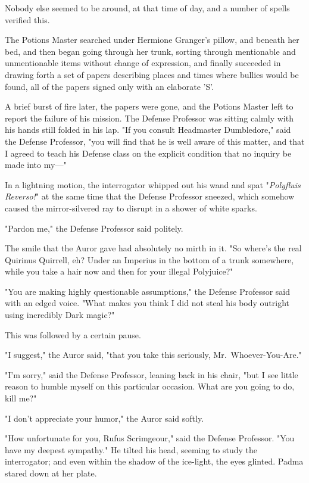 Nobody else seemed to be around, at that time of day, and a number of spells 
verified this.

The Potions Master searched under Hermione Granger's pillow, and beneath her 
bed, and then began going through her trunk, sorting through mentionable and 
unmentionable items without change of expression, and finally succeeded in 
drawing forth a set of papers describing places and times where bullies would 
be found, all of the papers signed only with an elaborate 'S'.

A brief burst of fire later, the papers were gone, and the Potions Master left 
to report the failure of his mission.
\sbreak
The Defense Professor was sitting calmly with his hands still folded in his 
lap. "If you consult Headmaster Dumbledore," said the Defense Professor, "you 
will find that he is well aware of this matter, and that I agreed to teach his 
Defense class on the explicit condition that no inquiry be made into my---"

In a lightning motion, the interrogator whipped out his wand and spat 
"\emph{Polyfluis Reverso!}" at the same time that the Defense Professor 
sneezed, which somehow caused the mirror-silvered ray to disrupt in a shower of 
white sparks.

"Pardon me," the Defense Professor said politely.

The smile that the Auror gave had absolutely no mirth in it. "So where's the 
real Quirinus Quirrell, eh? Under an Imperius in the bottom of a trunk 
somewhere, while you take a hair now and then for your illegal Polyjuice?"

"You are making highly questionable assumptions," the Defense Professor said 
with an edged voice. "What makes you think I did not steal his body outright 
using incredibly Dark magic?"

This was followed by a certain pause.

"I suggest," the Auror said, "that you take this seriously, 
Mr.~Whoever-You-Are."

"I'm sorry," said the Defense Professor, leaning back in his chair, "but I see 
little reason to humble myself on this particular occasion. What are you going 
to do, kill me?"

"I don't appreciate your humor," the Auror said softly.

"How unfortunate for you, Rufus Scrimgeour," said the Defense Professor. "You 
have my deepest sympathy." He tilted his head, seeming to study the 
interrogator; and even within the shadow of the ice-light, the eyes glinted.
\sbreak
Padma stared down at her plate.

